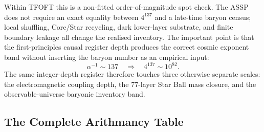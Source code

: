 \documentclass[11pt,a4paper]{article}
\begin{document}
Within TFOFT this is a non-fitted order-of-magnitude spot check. The ASSP does
not require an exact equality between \(4^{137}\) and a late-time baryon census;
local shuffling, Core/Star recycling, dark lower-layer substrate, and finite
boundary leakage all change the realised inventory. The important point is that
the first-principles causal register depth produces the correct cosmic exponent
band without inserting the baryon number as an empirical input:
\[
\alpha^{-1}\sim137
\quad\Longrightarrow\quad
4^{137}\sim10^{82}.
\]
The same integer-depth register therefore touches three otherwise separate
scales: the electromagnetic coupling depth, the 77-layer Star Ball mass closure,
and the observable-universe baryonic inventory band.


\subsection{The Complete Arithmancy Table}
\end{document}
